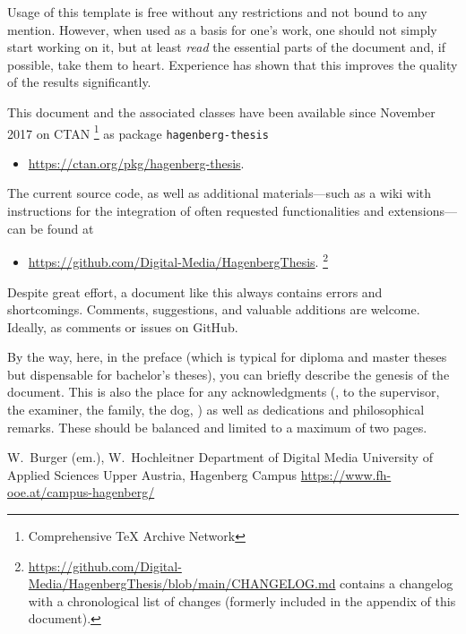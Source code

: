 Usage of this template is free without any restrictions and not bound to any
mention. However, when used as a basis for one's work, one should not simply
start working on it, but at least \emph{read} the essential parts of the
document and, if possible, take them to heart. Experience has shown that this
improves the quality of the results significantly.

This document and the associated \latex classes have been available since
November 2017 on CTAN%
\footnote{Comprehensive TeX Archive Network} 
as package \texttt{hagenberg-thesis}
%
\begin{itemize}
	\item[]\url{https://ctan.org/pkg/hagenberg-thesis}.
\end{itemize}
%
The current source code, as well as additional materials---such as a wiki with
instructions for the integration of often requested functionalities and
extensions---can be found at
%
\begin{itemize}
	\item[]\url{https://github.com/Digital-Media/HagenbergThesis}.%
	\footnote{\url{https://github.com/Digital-Media/HagenbergThesis/blob/main/CHANGELOG.md}
	contains a change\-log with a chronological list of changes (formerly
	included in the appendix of this document).}
\end{itemize}

\noindent
Despite great effort, a document like this always contains errors and
shortcomings. Comments, suggestions, and valuable additions are welcome.
Ideally, as comments or issues on GitHub.

By the way, here, in the preface (which is typical for diploma and master theses
but dispensable for bachelor's theses), you can briefly describe the genesis of
the document. This is also the place for any acknowledgments (\eg, to the
supervisor, the examiner, the family, the dog, \etc) as well as dedications and
philosophical remarks. These should be balanced and limited to a maximum of two
pages.

\vspace{6ex}
\noindent
W.\ Burger (em.), W.\ Hochleitner\newline
Department of Digital Media\newline
University of Applied Sciences Upper Austria, Hagenberg Campus \newline
\url{https://www.fh-ooe.at/campus-hagenberg/}
